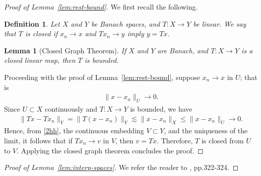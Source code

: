 \documentclass[12pt,reqno]{amsart}
\numberwithin{equation}{section}  %
\numberwithin{figure}{section}
\newtheorem{lemma}[theorem]{Lemma}
\newtheorem{definition}[theorem]{Definition}
\begin{document}
\begin{proof}[Proof of Lemma~\ref{lem:rest-bound}]
We first recall the following.
\begin{definition}
Let $X$ and $Y$ be Banach spaces, and $T: X \to Y$ be linear. We say that $T$ is
\emph{closed} if 
%
%
%
$x_{n} \to x$ and $Tx_{n} \to y$ imply $y = Tx$. 
\end{definition}

%
%
%
%
%
%
%
%
\begin{lemma}[Closed Graph Theorem]
\label{lem:closed-graph}
If $X$ and $Y$ are Banach, and $T: X \to Y$ is a closed linear map, then $T$ is
bounded.
\end{lemma}
%
%
Proceeding with the proof of Lemma~\ref{lem:rest-bound},
suppose $x_{n} \to x$ in $U$; that is
%
%
\begin{equation}
  \label{1hh}
\begin{split}
  \| x - x_{n} \|_{U} \to 0.
\end{split}
\end{equation}
%
%
Since $U \subset X$
continuously and
$T: X \to Y$ is bounded, we have
%
%
\begin{equation}
  \label{2hh}
\begin{split}
  \| Tx - Tx_{n} \|_{Y} = \| T(x - x_{n}) \|_{Y} \lesssim \| x -
  x_{n} \|_{X} \le  \| x - x_{n} \|_{U} \to 0.
\end{split}
\end{equation}
%
%
Hence, from \eqref{2hh}, the continuous embedding $V \subset Y$, 
and the uniqueness of the limit,
it follows that if $Tx_{n} \to v$ in $V$, then $v = Tx$. 
Therefore, $T$ is closed from
$U$ to $V$. Applying the closed graph theorem concludes the proof. 
\end{proof}
%
%
%
\begin{proof}[Proof of Lemma~\ref{lem:interp-spaces}]
  We refer the reader to \cite{Taylor:1995kx}, pp.322-324.
\end{proof}
\end{document}
